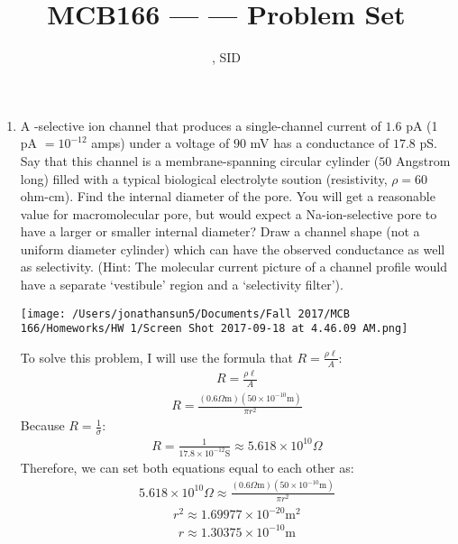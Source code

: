 \documentclass[11pt]{article}
\title{MCB166 --- \Session --- Problem Set \Homework}
\author{\Name, SID \SID}
\date{}
\begin{document}
\maketitle

\newpage
\begin{enumerate}[label=\arabic*.]
\item
A -selective ion channel that produces a single-channel current of $1.6$ pA (1 pA $= 10^{-12}$ amps) under a voltage of $90$ mV has a conductance of $17.8$ pS. Say that this channel is a membrane-spanning circular cylinder ($50$ Angstrom long) filled with a typical biological electrolyte soution (resistivity, $\rho = 60$ ohm-cm). Find the internal diameter of the pore. You will get a reasonable value for macromolecular pore, but would expect a Na-ion-selective pore to have a larger or smaller internal diameter? Draw a channel shape (not a uniform diameter cylinder) which can have the observed conductance as well as selectivity. (Hint: The molecular current picture of a channel profile would have a separate `vestibule' region and a `selectivity filter').
\begin{center}
\texttt{[image: /Users/jonathansun5/Documents/Fall 2017/MCB 166/Homeworks/HW 1/Screen Shot 2017-09-18 at 4.46.09 AM.png]}
\end{center}
To solve this problem, I will use the formula that $R = \frac{\rho \ell} {A}$:
\begin{align*}
R = \frac{\rho \ell} {A}
\end{align*}
\begin{align*}
R = \frac{\left(0.6\Omega \text{m}\right) \left(50 \times 10^{-10} \text{m}\right)} {\pi r^2}
\end{align*}
Because $R = \frac{1} {\sigma}$:
\begin{align*}
R = \frac{1} {17.8 \times 10^{-12} \text{S}} \approx 5.618 \times 10^{10} \Omega
\end{align*}
Therefore, we can set both equations equal to each other as:
\begin{align*}
5.618 \times 10^{10} \Omega \approx \frac{\left(0.6\Omega \text{m}\right) \left(50 \times 10^{-10} \text{m}\right)} {\pi r^2}
\end{align*}
\begin{align*}
r^2 \approx 1.69977 \times 10^{-20} \text{m}^2
\end{align*}
\begin{align*}
r \approx 1.30375 \times 10^{-10} \text{m}
\end{align*}

\end{enumerate}
\end{document}

